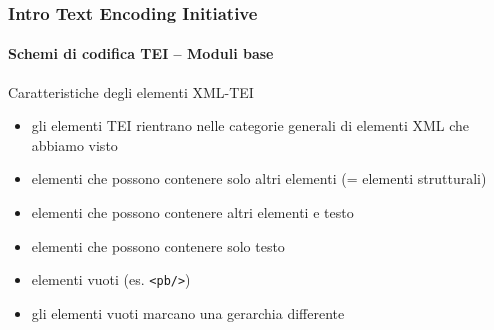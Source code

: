 \begin{frame}
	\frametitle{Intro Text Encoding Initiative}
	\framesubtitle{Schemi di codifica TEI – Moduli base}
	\addtocounter{nframe}{1}

	\begin{block}{Caratteristiche degli elementi XML-TEI}
        \begin{itemize}
            \item gli elementi TEI rientrano nelle categorie generali di
            elementi XML che abbiamo visto
            \item elementi che possono contenere solo altri elementi (=
            elementi strutturali)
            \item elementi che possono contenere altri elementi e testo
            \item elementi che possono contenere solo testo
            \item  elementi vuoti (es. \texttt{<pb/>})
            \item  gli elementi vuoti marcano una gerarchia differente
        \end{itemize}
    \end{block}
\end{frame}



	





